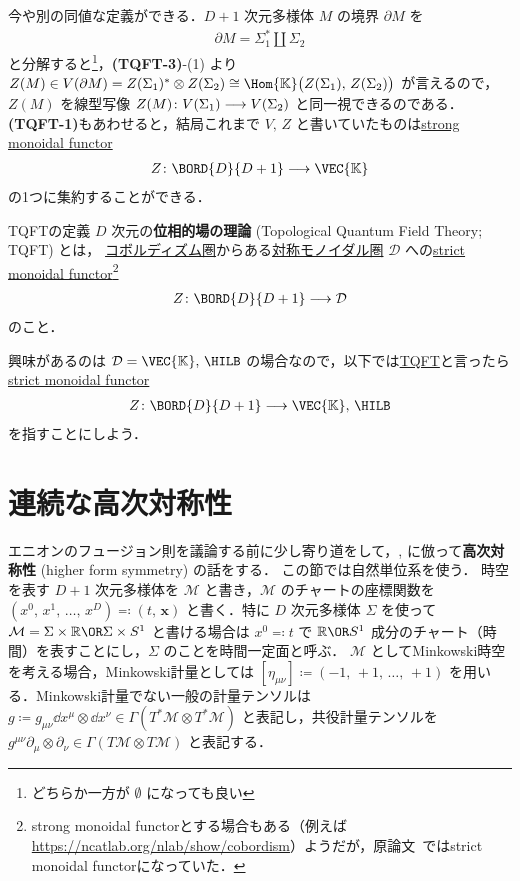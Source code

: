 \documentclass[TQFT_main]{subfiles}
\begin{document}
今や別の同値な定義ができる．$D+1$ 次元多様体 $M$ の境界 $\partial M$ を
\begin{align}
    \partial M = \Sigma_1^* \amalg \Sigma_2
\end{align}
と分解すると\footnote{どちらか一方が $\emptyset$ になっても良い}，\textsf{\textbf{(TQFT-3)}}-(1) より
$Z(M) \in V(\partial M) = Z(\Sigma_1)^* \otimes Z(\Sigma_2) \cong \Hom{\mathbb{K}} \bigl( Z(\Sigma_1),\, Z(\Sigma_2) \bigr)$ が言えるので，$Z(M)$ を線型写像 $Z(M) \colon V(\Sigma_1) \longrightarrow V(\Sigma_2)$ と同一視できるのである．
\textsf{\textbf{(TQFT-1)}}もあわせると，結局これまで $V,\, Z$ と書いていたものは\hyperref[def:monidal-functor]{strong monoidal functor}
\begin{align}
    Z \colon \BORD{D}{D+1}\lto \VEC{\mathbb{K}}
\end{align}
の1つに集約することができる．

\begin{mydef}[label=def:TQFT]{TQFTの定義}
    $D$ 次元の\textbf{位相的場の理論} (Topological Quantum Field Theory; TQFT) とは，
    \hyperref[Cob-string]{コボルディズム圏}からある\hyperref[def:braided-monoidal]{対称モノイダル圏} $\mathcal{D}$ への\hyperref[def:monidal-functor]{strict monoidal functor}\footnote{strong monoidal functorとする場合もある（例えば\url{https://ncatlab.org/nlab/show/cobordism}）ようだが，原論文~\cite{Atiyah1988tqft}ではstrict monoidal functorになっていた．}
    \begin{align}
        Z \colon \BORD{D}{D+1}\lto \mathcal{D}
    \end{align}
    のこと．
\end{mydef}

興味があるのは $\mathcal{D} = \VEC{\mathbb{K}},\, \HILB$ の場合なので，以下では\hyperref[ax:Atiyah-TQFT]{TQFT}と言ったら\hyperref[def:monidal-functor]{strict monoidal functor}
\begin{align}
    Z \colon \BORD{D}{D+1}\lto \VEC{\mathbb{K}},\, \HILB
\end{align}
を指すことにしよう．

\section{連続な高次対称性}

エニオンのフュージョン則を議論する前に少し寄り道をして，\cite{hidaka2022g-sym}, \cite{GaiottoKapustinSeibergWillett2015}に倣って\textbf{高次対称性} (higher form symmetry) の話をする．
この節では自然単位系を使う．
時空を表す $D + 1$ 次元多様体を $\mathcal{M}$ と書き，$\mathcal{M}$ のチャートの座標関数を $(x^0,\, x^1,\, \dots,\, x^{D}) \eqqcolon (t,\, \bm{x})$ と書く．特に $D$ 次元多様体 $\Sigma$ を使って $\mathcal{M} = \Sigma \times \mathbb{R} \OR \Sigma \times S^1$ と書ける場合は $x^0 \eqqcolon t$ で $\mathbb{R} \OR S^1$ 成分のチャート（時間）を表すことにし，$\Sigma$ のことを時間一定面と呼ぶ．
$\mathcal{M}$ としてMinkowski時空を考える場合，Minkowski計量としては $[\eta_{\mu\nu}] \coloneqq (-1,\, +1,\, \dots,\, +1)$ を用いる．Minkowski計量でない一般の計量テンソルは $g \coloneqq g_{\mu\nu} \dd{x}^\mu \otimes \dd{x}^\nu \in \Gamma (T^*\mathcal{M} \otimes T^* \mathcal{M})$ と表記し，共役計量テンソルを $g^{\mu\nu} \partial_\mu \otimes \partial_\nu \in \Gamma(T \mathcal{M} \otimes T \mathcal{M})$ と表記する．
\end{document}
